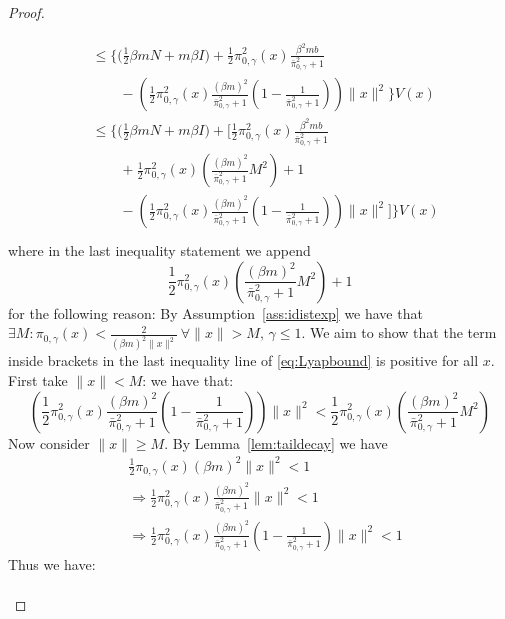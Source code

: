 \documentclass[journal,onecolumn]{IEEEtran}
\newcommand{\dimn}{N}
\newcommand{\ids}{\pi}
\newcommand{\idw}{\gamma}
\newcommand{\isp}{0,\idw}
\newcommand{\idistmaxw}{\bar{\ids}_{\isp}}
\newcommand{\tailbound}{M}
\newcommand{\idiffc}{I}
\newcommand{\dissm}{m}
\newcommand{\dissb}{b}
\newcommand{\idistrw}{\ids_{\isp}}
\newcommand{\larg}{x}
\begin{document}
{\begin{proof}
\begin{enumerate}
\begin{align}
\begin{split}
            & \leq \biggl\{\biggl(\frac{1}{2} \beta \dissm \dimn  + \dissm \beta \idiffc \biggr)  + \frac{1}{2}\idistrw^2(\larg) \frac{\beta^2 \dissm \dissb}{\idistmaxw^2+1} \\& \quad \quad - \left(\frac{1}{2}\idistrw^2(\larg)\frac{(\beta \dissm)^2}{\idistmaxw^2+1}\left(1 - \frac{1}{\idistmaxw^2+1}\right) \right)\|\larg\|^2 \biggr\}V(\larg) \\
            & \leq \biggl\{\biggl(\frac{1}{2}\beta \dissm \dimn  + \dissm \beta \idiffc \biggr)  + \biggl[ \frac{1}{2}\idistrw^2(\larg) \frac{\beta^2 \dissm \dissb}{\idistmaxw^2+1} \\&\quad \quad + \frac{1}{2}\idistrw^2(\larg)\left(\frac{(\beta \dissm)^2}{\idistmaxw^2 + 1}\tailbound^2\right) + 1 \\&\quad \quad - \left(\frac{1}{2}\idistrw^2(\larg)\frac{(\beta \dissm)^2}{\idistmaxw^2+1}\left(1 - \frac{1}{\idistmaxw^2+1}\right) \right)\|\larg\|^2\biggr] \biggr\}V(\larg) \\
        \end{split}
        \end{align}
        where in the last inequality statement we append \[\frac{1}{2}\idistrw^2(\larg)\left(\frac{(\beta \dissm)^2}{\idistmaxw^2 + 1}\tailbound^2\right) + 1\] for the following reason: By Assumption~\ref{ass:idistexp} we have that $\exists \tailbound : \idistrw(\larg) < \frac{2}{(\beta \dissm)^2\|\larg\|^2} \ \forall \|\larg\| > \tailbound, \,\idw\leq 1$. We aim to show that the term inside brackets in the last inequality line of \eqref{eq:Lyapbound} is positive for all $\larg$. First take $\|\larg\| < \tailbound$: we have that:
        \[\left(\frac{1}{2}\idistrw^2(\larg)\frac{(\beta \dissm)^2}{\idistmaxw^2+1}\left(1 - \frac{1}{\idistmaxw^2+1}\right) \right)\|\larg\|^2 <  \frac{1}{2}\idistrw^2(\larg)\left(\frac{(\beta \dissm)^2}{\idistmaxw^2 + 1}\tailbound^2\right)\]
        Now consider $\|\larg\| \geq \tailbound$. By Lemma~\ref{lem:taildecay} we have 
        \begin{align*}
                &\frac{1}{2}\idistrw(\larg)(\beta \dissm)^2\|\larg\|^2 < 1 \\
                &\Rightarrow \frac{1}{2}\idistrw^2(\larg) \frac{(\beta \dissm)^2}{\idistmaxw^2+1}\|\larg\|^2 < 1 \\
                &\Rightarrow \frac{1}{2}\idistrw^2(\larg) \frac{(\beta \dissm)^2}{\idistmaxw^2+1}\left(1 - \frac{1}{\idistmaxw^2+1}\right)\|\larg\|^2 < 1
        \end{align*} 
        Thus we have:
        \begin{align*}

\end{align*}
\end{enumerate}
\end{proof}}
\end{document}
